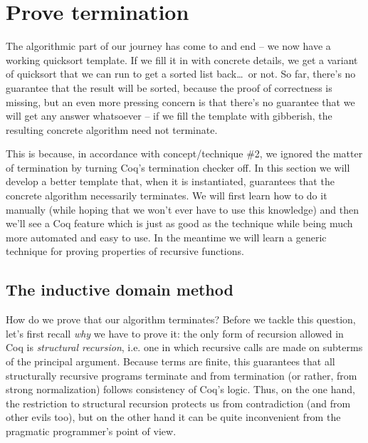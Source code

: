 \documentclass[declaration,mgr,english,shortabstract]{iithesis}
\begin{document}
\section{Prove termination} \label{termination}

The algorithmic part of our journey has come to and end -- we now have a working quicksort template. If we fill it in with concrete details, we get a variant of quicksort that we can run to get a sorted list back\dots\ or not. So far, there's no guarantee that the result will be sorted, because the proof of correctness is missing, but an even more pressing concern is that there's no guarantee that we will get any answer whatsoever -- if we fill the template with gibberish, the resulting concrete algorithm need not terminate.

This is because, in accordance with concept/technique \#2, we ignored the matter of termination by turning Coq's termination checker off. In this section we will develop a better template that, when it is instantiated, guarantees that the concrete algorithm necessarily terminates. We will first learn how to do it manually (while hoping that we won't ever have to use this knowledge) and then we'll see a Coq feature which is just as good as the technique while being much more automated and easy to use. In the meantime we will learn a generic technique for proving properties of recursive functions.

\subsection{The inductive domain method}

How do we prove that our algorithm terminates? Before we tackle this question, let's first recall \textit{why} we have to prove it: the only form of recursion allowed in Coq is \textit{structural recursion}, i.e. one in which recursive calls are made on subterms of the principal argument. Because terms are finite, this guarantees that all structurally recursive programs terminate and from termination (or rather, from strong normalization) follows consistency of Coq's logic. Thus, on the one hand, the restriction to structural recursion protects us from contradiction (and from other evils too), but on the other hand it can be quite inconvenient from the pragmatic programmer's point of view.
\end{document}

